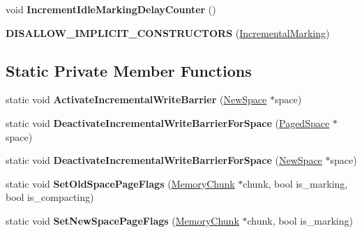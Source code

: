 \begin{DoxyCompactItemize}
\item 
void {\bfseries Increment\+Idle\+Marking\+Delay\+Counter} ()\hypertarget{classv8_1_1internal_1_1_incremental_marking_a5acce9e63d5075f5157b10f3201647ce}{}\label{classv8_1_1internal_1_1_incremental_marking_a5acce9e63d5075f5157b10f3201647ce}

\item 
{\bfseries D\+I\+S\+A\+L\+L\+O\+W\+\_\+\+I\+M\+P\+L\+I\+C\+I\+T\+\_\+\+C\+O\+N\+S\+T\+R\+U\+C\+T\+O\+RS} (\hyperlink{classv8_1_1internal_1_1_incremental_marking}{Incremental\+Marking})\hypertarget{classv8_1_1internal_1_1_incremental_marking_a3591a25caf86401226e4dff4d5dcd8b4}{}\label{classv8_1_1internal_1_1_incremental_marking_a3591a25caf86401226e4dff4d5dcd8b4}

\end{DoxyCompactItemize}
\subsection*{Static Private Member Functions}
\begin{DoxyCompactItemize}
\item 
static void {\bfseries Activate\+Incremental\+Write\+Barrier} (\hyperlink{classv8_1_1internal_1_1_new_space}{New\+Space} $\ast$space)\hypertarget{classv8_1_1internal_1_1_incremental_marking_a4ad5d6d015ed342e907dc7ff1d1b43bf}{}\label{classv8_1_1internal_1_1_incremental_marking_a4ad5d6d015ed342e907dc7ff1d1b43bf}

\item 
static void {\bfseries Deactivate\+Incremental\+Write\+Barrier\+For\+Space} (\hyperlink{classv8_1_1internal_1_1_paged_space}{Paged\+Space} $\ast$space)\hypertarget{classv8_1_1internal_1_1_incremental_marking_a3c43163c8c194ad2e0a231366302d156}{}\label{classv8_1_1internal_1_1_incremental_marking_a3c43163c8c194ad2e0a231366302d156}

\item 
static void {\bfseries Deactivate\+Incremental\+Write\+Barrier\+For\+Space} (\hyperlink{classv8_1_1internal_1_1_new_space}{New\+Space} $\ast$space)\hypertarget{classv8_1_1internal_1_1_incremental_marking_aa71bed09a08d4c2b837407065cc93586}{}\label{classv8_1_1internal_1_1_incremental_marking_aa71bed09a08d4c2b837407065cc93586}

\item 
static void {\bfseries Set\+Old\+Space\+Page\+Flags} (\hyperlink{classv8_1_1internal_1_1_memory_chunk}{Memory\+Chunk} $\ast$chunk, bool is\+\_\+marking, bool is\+\_\+compacting)\hypertarget{classv8_1_1internal_1_1_incremental_marking_adb99a384b676cc6f69a3a4018d7b42b2}{}\label{classv8_1_1internal_1_1_incremental_marking_adb99a384b676cc6f69a3a4018d7b42b2}

\item 
static void {\bfseries Set\+New\+Space\+Page\+Flags} (\hyperlink{classv8_1_1internal_1_1_memory_chunk}{Memory\+Chunk} $\ast$chunk, bool is\+\_\+marking)\hypertarget{classv8_1_1internal_1_1_incremental_marking_ae48c56ef00c8e7e801ce30054d8c864e}{}\label{classv8_1_1internal_1_1_incremental_marking_ae48c56ef00c8e7e801ce30054d8c864e}

\end{DoxyCompactItemize}
